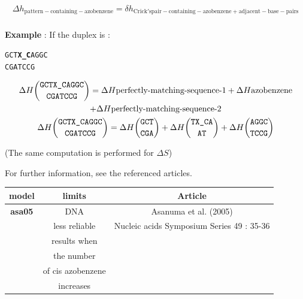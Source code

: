 \documentclass{article}
\begin{document}
\begin{multline*}
  \Delta{}h_\mathrm{pattern-containing-azobenzene} =
  \delta{}h_\mathrm{Crick's pair-containing-azobenzene+adjacent-base-pairs}\\
\end{multline*}

\textbf{Example} :
If the duplex is :
\begin{alltt}
GCT\textbf{X\_C}AGGC
CGATCCG
\end{alltt}
\begin{multline*}
\Delta H {\mbox{\texttt{GCTX\_CAGGC}} \choose \mbox{\texttt{CGATCCG}}} =
\Delta H {\mbox{perfectly-matching-sequence-1}} +
\Delta H {\mbox{azobenzene}} \\ +
\Delta H {\mbox{perfectly-matching-sequence-2}}\\
\Delta H {\mbox{\texttt{GCTX\_CAGGC}} \choose \mbox{\texttt{CGATCCG}}} =
\Delta H {\mbox{\texttt{GCT}} \choose \mbox{\texttt{CGA}}} +
\Delta H {\mbox{\texttt{TX\_CA}} \choose \mbox{\texttt{AT}}} +
\Delta H {\mbox{\texttt{AGGC}} \choose \mbox{\texttt{TCCG}}}\\
\end{multline*}

       (The same computation is performed for $\Delta S$) 
       
For further information, see the referenced articles.

\begin{table}[hc]
\begin{tabular}[h]{| c | c | c |}
\textbf{model} & \textbf{limits} & \textbf{Article} \\
\hline
\textbf{asa05} & DNA & Asanuma et al. (2005) \\
 & less reliable & Nucleic acids Symposium Series 49 : 35-36 \\
 & results when & \\
 & the number & \\
 & of cis azobenzene & \\
 & increases & \\
 \hline
\end{tabular}
\end{table}
\end{document}

